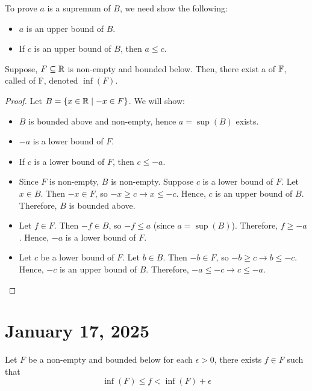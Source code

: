 \documentclass[11pt]{article}
\begin{document}
\begin{remark}
    To prove \(a\) is a supremum of \(B\), we need show the following:
    \begin{itemize}
        \item \(a\) is an upper bound of \(B\).
        \item If \(c\) is an upper bound of \(B\), then \(a \leqslant c\).
    \end{itemize}
\end{remark}

\begin{theorem}
    Suppose, \(F \subseteq \mathbb R\) is non-empty and bounded below. Then, there exist a  of \(\mathbb F\), called  of F, denoted \(\inf(F)\).
\end{theorem}
\begin{proof}
    Let \(B = \{x \in \mathbb R \mid -x \in F\}\). We will show:
    \begin{itemize}
        \item \(B\) is bounded above and non-empty, hence \(a = \sup(B)\) exists.
        \item \(-a\) is a lower bound of \(F\).
        \item If \(c\) is a lower bound of \(F\), then \(c \leqslant -a\).
    \end{itemize}
    \begin{itemize}
        \item Since \(F\) is non-empty, \(B\) is non-empty. Suppose \(c\) is a lower bound of
              \(F\). Let \(x \in B\). Then \(-x \in F\), so \(-x \geqslant c \rightarrow x
              \leqslant -c\). Hence, \(c\) is an upper bound of \(B\). Therefore, \(B\) is
              bounded above.
        \item Let \(f \in F\). Then \(-f \in B\), so \(-f \leq a\) (since \(a = \sup(B)\)).
              Therefore, \(f \geq -a\). Hence, \(-a\) is a lower bound of \(F\).
        \item Let \(c\) be a lower bound of \(F\). Let \(b \in B\). Then \(-b \in F\), so
              \(-b \geq c \rightarrow b \leq -c\). Hence, \(-c\) is an upper bound of \(B\).
              Therefore, \(-a \leq -c \rightarrow c \leq -a\).
    \end{itemize}
\end{proof}
\section{January 17, 2025}
\begin{corollary}
    Let \(F\) be a non-empty and bounded below for each \(\epsilon > 0\), there exists \(f \in F\) such that \[ \inf (F) \leqslant f < \inf(F) + \epsilon\]
\end{corollary}
\end{document}
